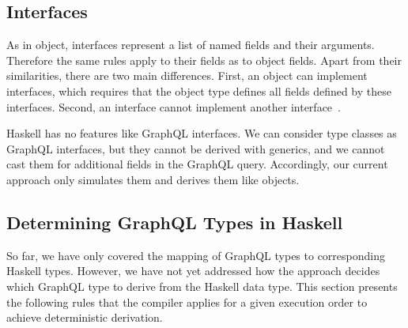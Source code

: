 

\subsection{Interfaces}
\label{sec:mapping:interfaces}

As in object, interfaces represent a list of named fields and their arguments. Therefore the same rules apply to their fields as to object fields. Apart from their similarities, there are two main differences. First, an object can implement interfaces, which requires that the object type defines all fields defined by these interfaces. Second, an interface cannot implement another interface~\cite{gql-spec}.

Haskell has no features like GraphQL interfaces. We can consider type classes as GraphQL interfaces, but they cannot be derived with generics, and we cannot cast them for additional fields in the GraphQL query. Accordingly, our current approach only simulates them and derives them like objects.


\subsection*{Determining GraphQL Types in Haskell}

So far, we have only covered the mapping of GraphQL types to corresponding Haskell types. However, we have not yet addressed how the approach decides which GraphQL type to derive from the Haskell data type.  This section presents the following rules that the compiler applies for a given execution order to achieve deterministic derivation.


